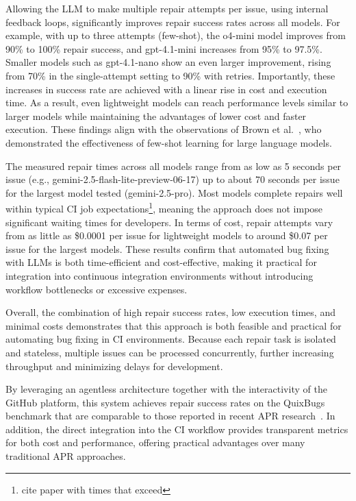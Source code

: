 Allowing the \ac{LLM} to make multiple repair attempts per issue, using internal feedback loops, significantly improves repair success rates across all models. For example, with up to three attempts (few-shot), the o4-mini model improves from 90\% to 100\% repair success, and gpt-4.1-mini increases from 95\% to 97.5\%. Smaller models such as gpt-4.1-nano show an even larger improvement, rising from 70\% in the single-attempt setting to 90\% with retries. Importantly, these increases in success rate are achieved with a linear rise in cost and execution time. As a result, even lightweight models can reach performance levels similar to larger models while maintaining the advantages of lower cost and faster execution. These findings align with the observations of Brown et al.~\cite{brownLanguageModelsAre2020}, who demonstrated the effectiveness of few-shot learning for large language models.

The measured repair times across all models range from as low as 5 seconds per issue (e.g., gemini-2.5-flash-lite-preview-06-17) up to about 70 seconds per issue for the largest model tested (gemini-2.5-pro). Most models complete repairs well within typical CI job expectations\footnote{cite paper with times that exceed}, meaning the approach does not impose significant waiting times for developers. In terms of cost, repair attempts vary from as little as \$0.0001 per issue for lightweight models to around \$0.07 per issue for the largest models. These results confirm that automated bug fixing with \acp{LLM} is both time-efficient and cost-effective, making it practical for integration into continuous integration environments without introducing workflow bottlenecks or excessive expenses.

Overall, the combination of high repair success rates, low execution times, and minimal costs demonstrates that this approach is both feasible and practical for automating bug fixing in CI environments. Because each repair task is isolated and stateless, multiple issues can be processed concurrently, further increasing throughput and minimizing delays for development.

By leveraging an agentless architecture together with the interactivity of the GitHub platform, this system achieves repair success rates on the QuixBugs benchmark that are comparable to those reported in recent APR research~\cite{huCanGPTO1Kill2024, }. In addition, the direct integration into the CI workflow provides transparent metrics for both cost and performance, offering practical advantages over many traditional APR approaches.

